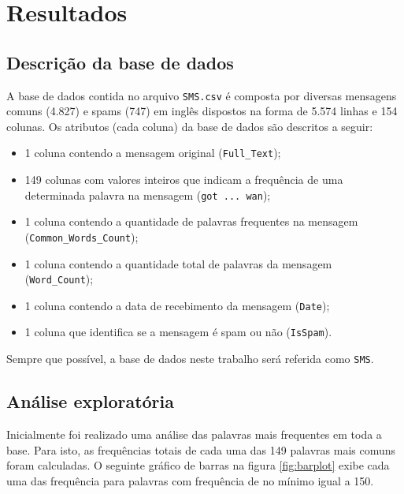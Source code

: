 \documentclass[a4paper,11pt]{article}
\begin{document}
\section{Resultados}

\subsection{Descrição da base de dados}

A base de dados contida no arquivo \texttt{SMS.csv} é composta por diversas mensagens comuns (4.827)
e spams (747) em inglês dispostos na forma de 5.574 linhas e 154 colunas. Os atributos (cada coluna) 
da base de dados são descritos a seguir:

\begin{itemize}
 \item 1 coluna contendo a mensagem original (\texttt{Full\_Text});
 \item 149 colunas com valores inteiros que indicam a frequência de uma determinada palavra na 
 mensagem (\texttt{got ... wan});
 \item 1 coluna contendo a quantidade de palavras frequentes na mensagem 
 (\texttt{Common\_Words\_Count});
 \item 1 coluna contendo a quantidade total de palavras da mensagem (\texttt{Word\_Count});
 \item 1 coluna contendo a data de recebimento da mensagem (\texttt{Date});
 \item 1 coluna que identifica se a mensagem é spam ou não (\texttt{IsSpam}).
\end{itemize}

Sempre que possível, a base de dados neste trabalho será referida como \texttt{SMS}.


\subsection{Análise exploratória}

Inicialmente foi realizado uma análise das palavras mais frequentes em toda a base. Para isto, 
as frequências totais de cada uma das 149 palavras mais comuns foram calculadas. O seguinte gráfico 
de barras na figura \ref{fig:barplot} exibe cada uma das frequência para palavras com frequência de 
no mínimo igual a 150.
\end{document}
